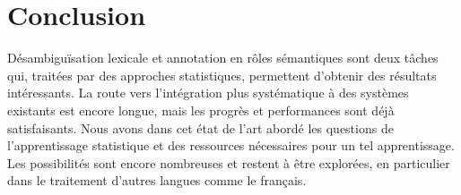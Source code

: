 \section{Conclusion}

Désambiguïsation lexicale et annotation en rôles sémantiques sont deux tâches qui, traitées par des approches statistiques, permettent d'obtenir des résultats intéressants. La route vers l'intégration plus systématique à des systèmes existants est encore longue, mais les progrès et performances sont déjà satisfaisants. Nous avons dans cet état de l'art abordé les questions de l'apprentissage statistique et des ressources nécessaires pour un tel apprentissage. Les possibilités sont encore nombreuses et restent à être explorées, en particulier dans le traitement d'autres langues comme le français.
